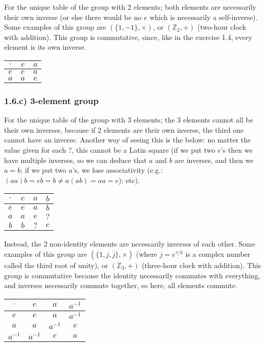 \documentclass[12pt, letterpaper, twoside]{report}
\begin{document}
For the unique table of the group with 2 elements; both elements are necessarily their own inverse (or else there would be no $e$ which is necessarily a self-inverse). Some examples of this group are $(\{ 1, -1 \}, \times)$, or $(\mathbb{Z}_2, +)$ (two-hour clock with addition). This group is commutative, since, like in the exercise 1.4, every element is its own inverse.

\begin{tabular}{|c||c|c|}
\hline
$\cdot$ & $e$ & $a$ \\ \hline \hline
$e    $ & $e$ & $a$ \\ \hline
$a    $ & $a$ & $e$ \\ \hline
\end{tabular}


\subsubsection*{1.6.c) 3-element group}

For the unique table of the group with 3 elements; the 3 elements cannot all be their own inverses, because if 2 elements are their own inverse, the third one cannot have an inverse. Another way of seeing this is the below: no matter the value given for each $?$, this cannot be a Latin square (if we put two $e$'s then we have multiple inverses, so we can deduce that $a$ and $b$ are inverses, and then we $a = b$; if we put two $a$'s, we lose associativity (e.g.: $(aa)b = eb = b \ne a(ab) = aa = e$); etc).

\begin{tabular}{|c||c|c|c|}
\hline
$\cdot$ & $e$ & $a$ & $b$ \\ \hline \hline
$e    $ & $e$ & $a$ & $b$ \\ \hline
$a    $ & $a$ & $e$ & $?$ \\ \hline
$b    $ & $b$ & $?$ & $e$ \\ \hline
\end{tabular}

Instead, the 2 non-identity elements are necessarily inverses of each other. Some examples of this group are $(\{1, j, \overline{j} \}, \times)$ (where $j = e^{\tau / 3}$ is a complex number called the third root of unity), or $(\mathbb{Z}_3, +)$ (three-hour clock with addition). This group is commutative because the identity necessarily commutes with everything, and inverses necessarily commute together, so here, all elements commute.

\begin{tabular}{|c||c|c|c|}
\hline
$\cdot $ & $e     $ & $a     $ & $a^{-1}$ \\ \hline \hline
$e     $ & $e     $ & $a     $ & $a^{-1}$ \\ \hline
$a     $ & $a     $ & $a^{-1}$ & $e     $ \\ \hline
$a^{-1}$ & $a^{-1}$ & $e     $ & $a     $ \\ \hline
\end{tabular}
\end{document}
